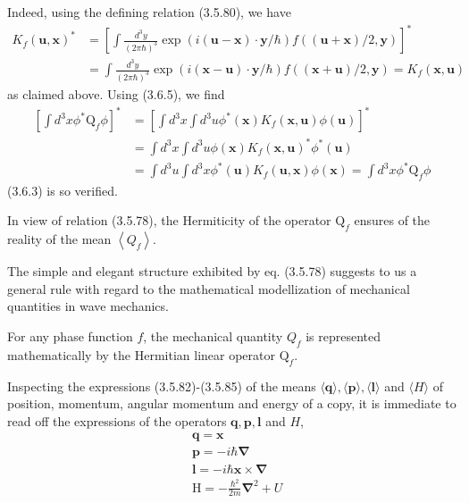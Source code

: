 \documentclass{article}
\begin{document}
Indeed, using the defining relation (3.5.80), we have
$$
\begin{align*}
K_{f}(\boldsymbol{u}, \boldsymbol{x})^{*} & =\left[\int \frac{d^{3} y}{(2 \pi \hbar)^{3}} \exp (i(\boldsymbol{u}-\boldsymbol{x}) \cdot \boldsymbol{y} / \hbar) f((\boldsymbol{u}+\boldsymbol{x}) / 2, \boldsymbol{y})\right]^{*}  \tag{3.6.6}\\
& =\int \frac{d^{3} y}{(2 \pi \hbar)^{3}} \exp (i(\boldsymbol{x}-\boldsymbol{u}) \cdot \boldsymbol{y} / \hbar) f((\boldsymbol{x}+\boldsymbol{u}) / 2, \boldsymbol{y})=K_{f}(\boldsymbol{x}, \boldsymbol{u})
\end{align*}
$$
as claimed above. Using (3.6.5), we find
$$
\begin{align*}
{\left[\int d^{3} x \phi^{*} \mathrm{Q}_{f} \phi\right]^{*} } & =\left[\int d^{3} x \int d^{3} u \phi^{*}(\boldsymbol{x}) K_{f}(\boldsymbol{x}, \boldsymbol{u}) \phi(\boldsymbol{u})\right]^{*}  \tag{3.6.7}\\
& =\int d^{3} x \int d^{3} u \phi(\boldsymbol{x}) K_{f}(\boldsymbol{x}, \boldsymbol{u})^{*} \phi^{*}(\boldsymbol{u}) \\
& =\int d^{3} u \int d^{3} x \phi^{*}(\boldsymbol{u}) K_{f}(\boldsymbol{u}, \boldsymbol{x}) \phi(\boldsymbol{x})=\int d^{3} x \phi^{*} \mathrm{Q}_{f} \phi
\end{align*}
$$
(3.6.3) is so verified.

In view of relation (3.5.78), the Hermiticity of the operator $\mathrm{Q}_{f}$ ensures of the reality of the mean $\left\langle Q_{f}\right\rangle$.

The simple and elegant structure exhibited by eq. (3.5.78) suggests to us a general rule with regard to the mathematical modellization of mechanical quantities in wave mechanics.

For any phase function $f$, the mechanical quantity $Q_{f}$ is represented mathematically by the Hermitian linear operator $\mathrm{Q}_{f}$.

Inspecting the expressions (3.5.82)-(3.5.85) of the means $\langle\boldsymbol{q}\rangle,\langle\boldsymbol{p}\rangle,\langle\boldsymbol{l}\rangle$ and $\langle H\rangle$ of position, momentum, angular momentum and energy of a copy, it is immediate to read off the expressions of the operators $\mathbf{q}, \mathbf{p}, \mathbf{l}$ and $H$,
$$
\begin{align*}
& \mathbf{q}=\boldsymbol{x}  \tag{3.6.8}\\
& \mathbf{p}=-i \hbar \boldsymbol{\nabla}  \tag{3.6.9}\\
& \mathbf{l}=-i \hbar \boldsymbol{x} \times \boldsymbol{\nabla}  \tag{3.6.10}\\
& \mathrm{H}=-\frac{\hbar^{2}}{2 m} \boldsymbol{\nabla}^{2}+U \tag{3.6.11}
\end{align*}
$$
\end{document}
